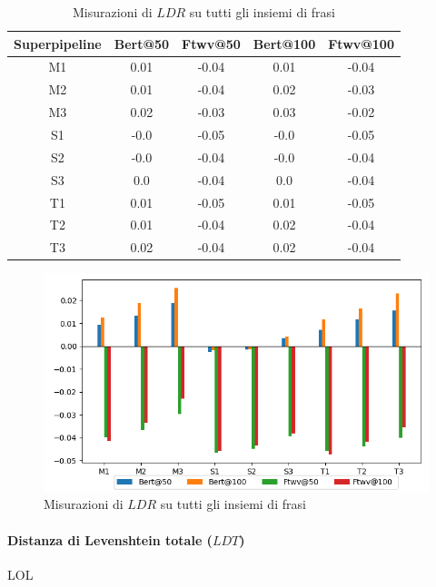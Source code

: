 \begin{table}[H]
\centering
\begin{tabular}{c|cc|cc}
\textbf{Superpipeline} & \textbf{Bert@50} &  \textbf{Ftwv@50} & \textbf{Bert@100} & \textbf{Ftwv@100}\\
\hline
M1& 0.01& -0.04& 0.01& -0.04\\
M2& 0.01& -0.04& 0.02& -0.03\\
M3& 0.02& -0.03& 0.03& -0.02\\
S1& -0.0& -0.05& -0.0& -0.05\\
S2& -0.0& -0.04& -0.0& -0.04\\
S3& 0.0& -0.04& 0.0& -0.04\\
T1& 0.01& -0.05& 0.01& -0.05\\
T2& 0.01& -0.04& 0.02& -0.04\\
T3& 0.02& -0.04& 0.02& -0.04\\
\end{tabular}
\caption{Misurazioni di $LDR$ su tutti gli insiemi di frasi}
\label{fig:test_res_ldr_gra}
\end{table}

\begin{figure}[H]
\centering
\includegraphics[width=\textwidth]{immagini/test/ldr}
\caption{Misurazioni di $LDR$ su tutti gli insiemi di frasi}
\label{fig:test_res_ldr}
\end{figure}









\paragraph{Distanza di Levenshtein totale ($LDT$)}
LOL

